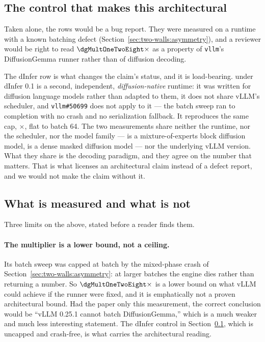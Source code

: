 \subsection{The control that makes this architectural}
\label{sec:mechanism:control}

Taken alone, the \modelDG{} rows would be a bug report. They were measured on a
runtime with a known batching defect (Section~\ref{sec:two-walls:asymmetry}),
and a reviewer would be right to read $\dgMultOneTwoEight\times$ as a property
of \texttt{vllm}'s DiffusionGemma runner rather than of diffusion decoding.

The dInfer row is what changes the claim's status, and it is load-bearing.
\modelLLaDA{} under dInfer 0.1 is a second, independent, \emph{diffusion-native}
runtime: it was written for diffusion language models rather than adapted to
them, it does not share vLLM's scheduler, and \texttt{vllm\#50699} does not
apply to it --- the batch sweep ran to completion with no crash and no
serialization fallback. It reproduces the same cap, \lladaMultDinfer$\times$,
flat to batch 64. The two measurements share neither the runtime, nor the
scheduler, nor the model family --- \modelDG{} is a mixture-of-experts block
diffusion model, \modelLLaDA{} is a dense masked diffusion model --- nor the
underlying vLLM version. What they share is the decoding paradigm, and they
agree on the number that matters. That is what licenses an architectural claim
instead of a defect report, and we would not make the claim without it.

\subsection{What is measured and what is not}
\label{sec:mechanism:honesty}

Three limits on the above, stated before a reader finds them.

\paragraph{The \modelDG{} multiplier is a lower bound, not a ceiling.}
Its batch sweep was capped at batch \dgBatchCap{} by the mixed-phase crash of
Section~\ref{sec:two-walls:asymmetry}: at larger batches the engine dies rather
than returning a number. So $\dgMultOneTwoEight\times$ is a lower bound on what
vLLM could achieve if the runner were fixed, and it is emphatically not a proven
architectural bound. Had the paper only this measurement, the correct conclusion
would be ``vLLM 0.25.1 cannot batch DiffusionGemma,'' which is a much weaker and
much less interesting statement. The dInfer control in
Section~\ref{sec:mechanism:control}, which is uncapped and crash-free, is what
carries the architectural reading.

